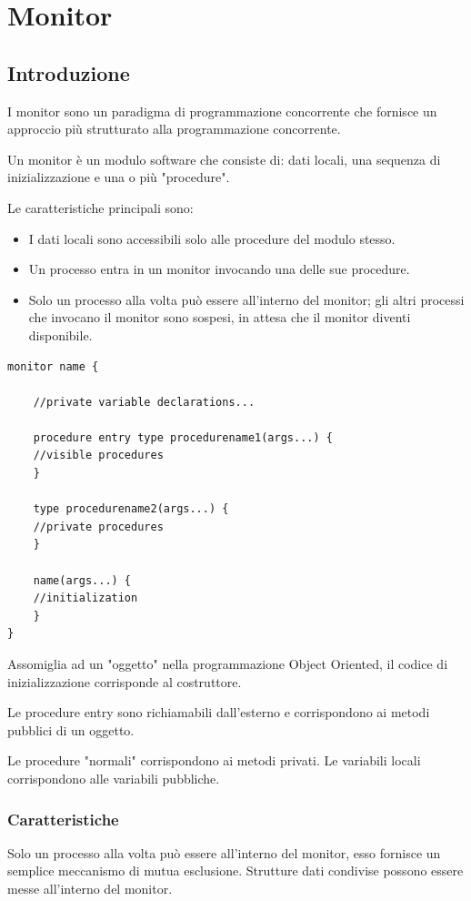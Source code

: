 \newpage
\section{Monitor}
\subsection{Introduzione}
I monitor sono un paradigma di programmazione concorrente che fornisce un approccio più strutturato alla programmazione concorrente.

Un monitor è un modulo software che consiste di: dati locali, una sequenza di inizializzazione e una o più "procedure".

Le caratteristiche principali sono:
\begin{itemize}
    \item I dati locali sono accessibili solo alle procedure del modulo stesso.
    \item Un processo entra in un monitor invocando una delle sue procedure.
    \item Solo un processo alla volta può essere all'interno del monitor; gli altri processi che invocano il monitor sono sospesi, in attesa che il monitor diventi disponibile.
\end{itemize}

\begin{lstlisting}
monitor name {
    
    //private variable declarations...

    procedure entry type procedurename1(args...) {
    //visible procedures 
    }

    type procedurename2(args...) {
    //private procedures
    }

    name(args...) {
    //initialization
    }
}
\end{lstlisting}

Assomiglia ad un "oggetto" nella programmazione Object Oriented, il codice di inizializzazione corrisponde al costruttore.

Le procedure entry sono richiamabili dall'esterno e corrispondono ai metodi pubblici di un oggetto.

Le procedure "normali" corrispondono ai metodi privati.
Le variabili locali corrispondono alle variabili pubbliche.

\subsubsection{Caratteristiche}
Solo un processo alla volta può essere all'interno del monitor, esso fornisce un semplice meccanismo di mutua esclusione. Strutture dati condivise possono essere messe all'interno del monitor.

